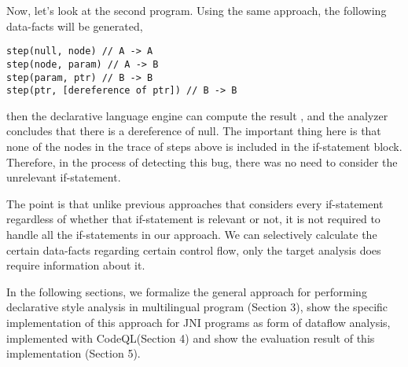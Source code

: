 Now, let's look at the second program. Using the same approach, the following
data-facts will be generated,

\begin{lstlisting}[style=myDatalog,xleftmargin=2.5em]
step(null, node) // A -> A
step(node, param) // A -> B
step(param, ptr) // B -> B
step(ptr, [dereference of ptr]) // B -> B
\end{lstlisting}
then the declarative language engine can compute the result , and the analyzer concludes that there is a dereference
of null. The important thing here is that none of the nodes in the trace of
steps above is included in the if-statement block. Therefore, in the process of
detecting this bug, there was no need to consider the unrelevant if-statement.


The point is that unlike previous approaches that considers every if-statement
regardless of whether that if-statement is relevant or not, it is not required
to handle all the if-statements in our approach. We can selectively calculate
the certain data-facts regarding certain control flow, only the target analysis
does require information about it.

In the following sections, we formalize the general approach for performing
declarative style analysis in multilingual program (Section 3), show the
specific implementation of this approach for JNI programs as form of dataflow
analysis, implemented with CodeQL(Section 4) and show the evaluation result of
this implementation (Section 5).
